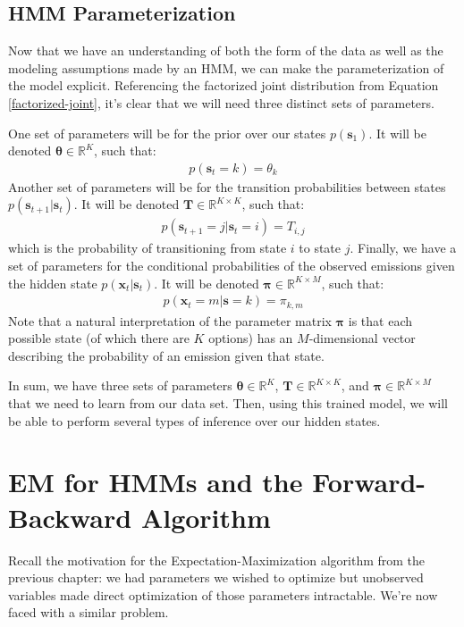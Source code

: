 \subsection{HMM Parameterization}
Now that we have an understanding of both the form of the data as well as the modeling assumptions made by an HMM, we can make the parameterization of the model explicit. Referencing the factorized joint distribution from Equation \ref{factorized-joint}, it's clear that we will need three distinct sets of parameters.

One set of parameters will be for the prior over our states $p(\textbf{s}_1)$. It will be denoted $\boldsymbol{\theta} \in \mathbb{R}^{K}$, such that:
\begin{align*}
	p(\textbf{s}_t = k) = \theta_k
\end{align*}
Another set of parameters will be for the transition probabilities between states $p(\textbf{s}_{t+1} | \textbf{s}_t)$. It will be denoted $\textbf{T} \in \mathbb{R}^{K \times K}$, such that:
\begin{align*}
	p(\textbf{s}_{t+1} = j | \textbf{s}_t = i) = T_{i,j}
\end{align*}
which is the probability of transitioning from state $i$ to state $j$. Finally, we have a set of parameters for the conditional probabilities of the observed emissions given the hidden state $p(\textbf{x}_t | \textbf{s}_t)$. It will be denoted $\boldsymbol{\pi} \in \mathbb{R}^{K \times M}$, such that:
\begin{align*}
	p(\textbf{x}_t = m | \textbf{s} = k) = \pi_{k, m}
\end{align*}
Note that a natural interpretation of the parameter matrix $\boldsymbol{\pi}$ is that each possible state (of which there are $K$ options) has an $M$-dimensional vector describing the probability of an emission given that state.

In sum, we have three sets of parameters $\boldsymbol{\theta} \in \mathbb{R}^{K}$, $\textbf{T} \in \mathbb{R}^{K \times K}$, and $\boldsymbol{\pi} \in \mathbb{R}^{K \times M}$ that we need to learn from our data set. Then, using this trained model, we will be able to perform several types of inference over our hidden states.

\section{EM for HMMs and the Forward-Backward Algorithm}
Recall the motivation for the Expectation-Maximization algorithm from the previous chapter: we had parameters we wished to optimize but unobserved variables made direct optimization of those parameters intractable. We're now faced with a similar problem.

